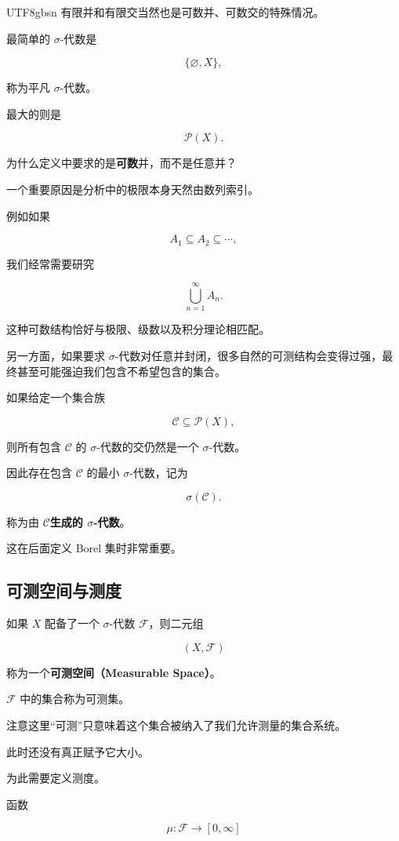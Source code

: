 \documentclass[11pt]{article}
\begin{document}
\begin{CJK*}{UTF8}{gbsn}
有限并和有限交当然也是可数并、可数交的特殊情况。

最简单的 $\sigma$-代数是

\[
\{\varnothing,X\},
\]

称为平凡 $\sigma$-代数。

最大的则是

\[
\mathcal{P}(X).
\]

为什么定义中要求的是\textbf{可数}并，而不是任意并？

一个重要原因是分析中的极限本身天然由数列索引。

例如如果

\[
A_{1}\subseteq A_{2}\subseteq\cdots,
\]

我们经常需要研究

\[
\bigcup_{n=1}^{\infty}A_{n}.
\]

这种可数结构恰好与极限、级数以及积分理论相匹配。

另一方面，如果要求 $\sigma$-代数对任意并封闭，很多自然的可测结构会变得过强，最终甚至可能强迫我们包含不希望包含的集合。

如果给定一个集合族

\[
\mathcal{C}\subseteq\mathcal{P}(X),
\]

则所有包含 $\mathcal{C}$ 的 $\sigma$-代数的交仍然是一个 $\sigma$-代数。

因此存在包含 $\mathcal{C}$ 的最小 $\sigma$-代数，记为

\[
\sigma(\mathcal{C}).
\]

称为由 $\mathcal{C}$\textbf{生成的 $\sigma$-代数}。

这在后面定义 Borel 集时非常重要。

\subsection{可测空间与测度}

如果 $X$ 配备了一个 $\sigma$-代数 $\mathcal{F}$，则二元组

\[
(X,\mathcal{F})
\]

称为一个\textbf{可测空间（Measurable Space）}。

$\mathcal{F}$ 中的集合称为可测集。

注意这里“可测”只意味着这个集合被纳入了我们允许测量的集合系统。

此时还没有真正赋予它大小。

为此需要定义测度。

函数

\[
\mu:\mathcal{F}\rightarrow[0,\infty]
\]


\end{CJK*}
\end{document}
